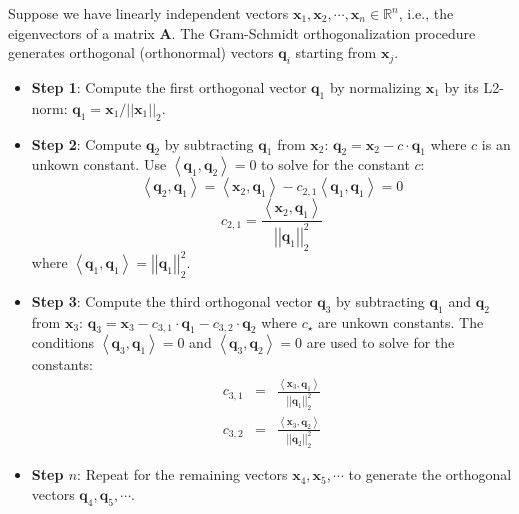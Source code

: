 \documentclass{article}[11pt]
\newcommand{\norm}[1]{\left|\left|#1\right|\right|}
\begin{document}
\begin{mdframed}
Suppose we have linearly independent vectors $\mathbf{x}_{1}, \mathbf{x}_{2}, \cdots, \mathbf{x}_{n}\in\mathbb{R}^{n}$, i.e., the eigenvectors of a matrix $\mathbf{A}$.
The Gram-Schmidt orthogonalization procedure generates orthogonal (orthonormal) vectors $\mathbf{q}_{i}$ starting from $\mathbf{x}_{j}$.
\begin{itemize}[leftmargin=16pt]
   \item{\textbf{Step 1}: Compute the first orthogonal vector $\mathbf{q}_{1}$ by normalizing $\mathbf{x}_{1}$ by its L2-norm:  $\mathbf{q}_{1} =  \mathbf{x}_{1}/\norm{\mathbf{x}_{1}}_{2}$.}
   \item{\textbf{Step 2}: Compute $\mathbf{q}_{2}$ by subtracting $\mathbf{q}_{1}$ from $\mathbf{x}_{2}$: $\mathbf{q}_{2} = \mathbf{x}_{2} - c\cdot\mathbf{q}_{1}$
      where $c$ is an unkown constant. Use $\left<\mathbf{q}_{1},\mathbf{q}_{2}\right> = 0$ to solve for the constant $c$:
      \begin{equation*}
         \left<\mathbf{q}_{2},\mathbf{q}_{1}\right> = \left<\mathbf{x}_{2},\mathbf{q}_{1}\right> - c_{2,1}\left<\mathbf{q}_{1},\mathbf{q}_{1}\right> = 0
      \end{equation*}
      \begin{equation*}
         c_{2,1} = \frac{\left<\mathbf{x}_{2},\mathbf{q}_{1}\right>}{\norm{\mathbf{q}_{1}}_{2}^{2}}
      \end{equation*}
      where $\left<\mathbf{q}_{1},\mathbf{q}_{1}\right> = \norm{\mathbf{q}_{1}}_{2}^{2}$.}
   \item{\textbf{Step 3}: Compute the third orthogonal vector $\mathbf{q}_{3}$ by subtracting $\mathbf{q}_{1}$ and $\mathbf{q}_{2}$ from $\mathbf{x}_{3}$: $\mathbf{q}_{3} = \mathbf{x}_{3} - c_{3,1}\cdot\mathbf{q}_{1} - c_{3,2}\cdot\mathbf{q}_{2}$
      where $c_{\star}$ are unkown constants. The conditions $\left<\mathbf{q}_{3},\mathbf{q}_{1}\right> = 0$
      and $\left<\mathbf{q}_{3},\mathbf{q}_{2}\right> = 0$ are used to solve for the constants:
      \begin{eqnarray*}
         c_{3,1} & = & \frac{\left<\mathbf{x}_{3},\mathbf{q}_{1}\right>}{\norm{\mathbf{q}_{1}}_{2}^{2}} \\
         c_{3,2} & = &  \frac{\left<\mathbf{x}_{3},\mathbf{q}_{2}\right>}{\norm{\mathbf{q}_{2}}_{2}^{2}}
      \end{eqnarray*}}
   \item{\textbf{Step $n$}: Repeat for the remaining vectors $\mathbf{x}_{4},\mathbf{x}_{5},\cdots$ to generate the orthogonal vectors $\mathbf{q}_{4},\mathbf{q}_{5},\cdots$.
}
\end{itemize}
\end{mdframed}
\end{document}
